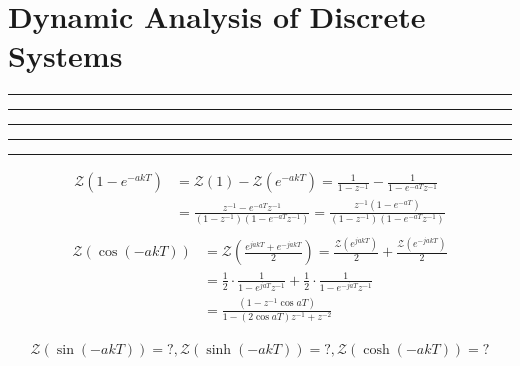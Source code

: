 \setcounter{chapter}{7}
\setcounter{section}{1}
\section{Dynamic Analysis of Discrete Systems}
\vspace{-8pt} \hrule \hrule \hrule \hrule \hrule  \vspace{12pt}


				\begin{align*}
							\mathcal{Z}(1-e^{-akT}) &= \mathcal{Z}(1) - \mathcal{Z}(e^{-akT}) = \frac{1}{1-z^{-1} } -  \frac{1}{1-e^{-aT}z^{-1}}\\
							                        & = \frac{z^{-1}-e^{-aT}z^{-1}}{(1-z^{-1})(1-e^{-aT}z^{-1})} =  \frac{z^{-1}(1-e^{-aT})}{(1-z^{-1})(1-e^{-aT}z^{-1})} \\
				\end{align*}
				\begin{align*}
					\mathcal{Z}(\cos(-akT))  &= \mathcal{Z}(\frac{e^{jakT}+e^{-jakT}}{2}) =\frac{\mathcal{Z}(e^{jakT})}{2} +\frac{\mathcal{Z}(e^{-jakT})}{2}  \\
					 & = \frac{1}{2} \cdot \frac{1}{1-e^{jaT}z^{-1}}  + \frac{1}{2} \cdot \frac{1}{1-e^{-jaT}z^{-1}} \\
					 & = \frac{(1- z^{-1}\cos aT )}{1-(2\cos aT)z^{-1} +z^{-2}}
				\end{align*}

				\begin{align*}
					\mathcal{Z}(\sin(-akT)) = ? , \mathcal{Z}(\sinh(-akT)) = ? , \mathcal{Z}(\cosh(-akT))= ?
				\end{align*}

	